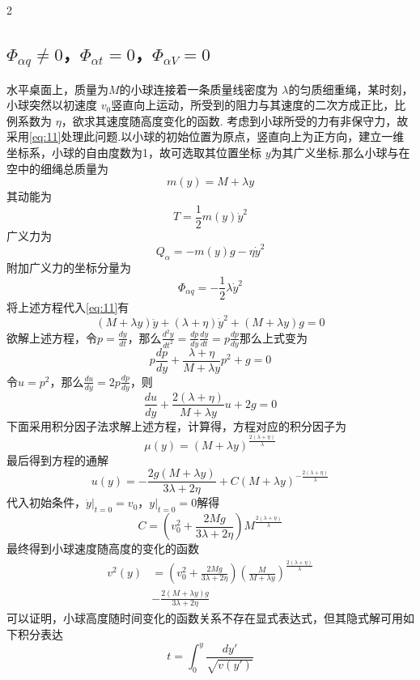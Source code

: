 \documentclass[12pt,twoside]{article}
\numberwithin{equation}{section}    %
\begin{document}
\begin{multicols}{2}
    \subsection{$\varPhi _{\alpha q}\ne 0$，$\varPhi _{\alpha t}=0$，$\varPhi _{\alpha V}=0$}
    水平桌面上，质量为$M$的小球连接着一条质量线密度为 $\lambda $的匀质细重绳，某时刻，小球突然以初速度 $v_0$竖直向上运动，所受到的阻力与其速度的二次方成正比，比例系数为 $\eta $，欲求其速度随高度变化的函数.
    考虑到小球所受的力有非保守力，故采用\eqref{eq:11}处理此问题.以小球的初始位置为原点，竖直向上为正方向，建立一维坐标系，小球的自由度数为1，故可选取其位置坐标 $y$为其广义坐标.那么小球与在空中的细绳总质量为
    \[
        m\left( y \right) =M+\lambda y
    \]
    其动能为
    \[
        T=\frac{1}{2}m\left( y \right) \dot{y}^2
    \]
    广义力为
    \[
        Q_{\alpha}=-m\left( y \right) g-\eta \dot{y}^2
    \]
    附加广义力的坐标分量为
    \[
        \varPhi _{\alpha q}=-\frac{1}{2}\lambda \dot{y}^2
    \]
    将上述方程代入\eqref{eq:11}有
    \[
        \left( M+\lambda y \right) \ddot{y}+\left( \lambda +\eta \right) \dot{y}^2+\left( M+\lambda y \right) g=0
    \]
    欲解上述方程，令$p=\frac{dy}{dt}$，那么$\frac{d^2y}{dt^2}=\frac{dp}{dy}\frac{dy}{dt}=p\frac{dp}{dy}$那么上式变为
    \[
        p\frac{dp}{dy}+\frac{\lambda +\eta}{M+\lambda y}p^2+g=0
    \]
    令$u=p^2$，那么$\frac{du}{dy}=2p\frac{dp}{dy}$，则
    \[
        \frac{du}{dy}+\frac{2\left( \lambda +\eta \right)}{M+\lambda y}u+2g=0
    \]
    下面采用积分因子法求解上述方程，计算得，方程对应的积分因子为
    \[
        \mu \left( y \right) =\left( M+\lambda y \right) ^{\frac{2\left( \lambda +\eta \right)}{\lambda}}
    \]
    最后得到方程的通解
    \[
        u\left( y \right) =-\frac{2g\left( M+\lambda y \right)}{3\lambda +2\eta}+C\left( M+\lambda y \right) ^{-\frac{2\left( \lambda +\eta \right)}{\lambda}}
    \]
    代入初始条件，$\dot{y}|_{t=0}=v_0$，$y|_{t=0}=0$解得
    \[
        C=\left( v_{0}^{2}+\frac{2Mg}{3\lambda +2\eta} \right) M^{\frac{2\left( \lambda +\eta \right)}{\lambda}}
    \]
    最终得到小球速度随高度的变化的函数
    \[
        \begin{split}
            v^2\left( y \right) &=\left( v_{0}^{2}+\frac{2Mg}{3\lambda +2\eta} \right) \left( \frac{M}{M+\lambda y} \right) ^{\frac{2\left( \lambda +\eta \right)}{\lambda}}
            \\
            &-\frac{2\left( M+\lambda y \right) g}{3\lambda +2\eta}
        \end{split}
    \]
    可以证明，小球高度随时间变化的函数关系不存在显式表达式，但其隐式解可用如下积分表达
    \[
        t=\int_0^y{\frac{dy\prime}{\sqrt{v\left( y\prime \right)}}}
    \]

\end{multicols}
\end{document}

